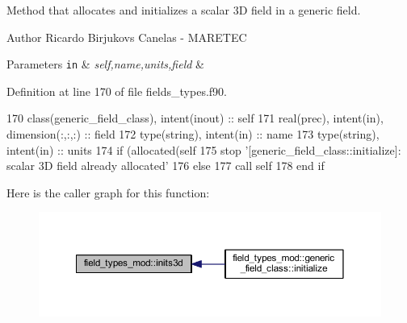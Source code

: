 Method that allocates and initializes a scalar 3D field in a generic field. 

\begin{DoxyAuthor}{Author}
Ricardo Birjukovs Canelas -\/ M\+A\+R\+E\+T\+EC 
\end{DoxyAuthor}

\begin{DoxyParams}[1]{Parameters}
\mbox{\tt in}  & {\em self,name,units,field} & \\
\hline
\end{DoxyParams}


Definition at line 170 of file fields\+\_\+types.\+f90.


\begin{DoxyCode}
170     \textcolor{keywordtype}{class}(generic\_field\_class), \textcolor{keywordtype}{intent(inout)} :: self
171     \textcolor{keywordtype}{real(prec)}, \textcolor{keywordtype}{intent(in)}, \textcolor{keywordtype}{dimension(:,:,:)} :: field
172     \textcolor{keywordtype}{type}(string), \textcolor{keywordtype}{intent(in)} :: name
173     \textcolor{keywordtype}{type}(string), \textcolor{keywordtype}{intent(in)} :: units
174     \textcolor{keywordflow}{if} (\textcolor{keyword}{allocated}(self%
175         stop \textcolor{stringliteral}{'[generic\_field\_class::initialize]: scalar 3D field already allocated'}
176     \textcolor{keywordflow}{else}
177         \textcolor{keyword}{call }self%
178 \textcolor{keywordflow}{    end if}
\end{DoxyCode}
Here is the caller graph for this function\+:\nopagebreak
\begin{figure}[H]
\begin{center}
\leavevmode
\includegraphics[width=350pt]{namespacefield__types__mod_ac3c3c9514102272c69299be06deabbcd_icgraph}
\end{center}
\end{figure}
\mbox{\label{namespacefield__types__mod_a0499b29bbd4e4628fe73678cf554d918}} 
